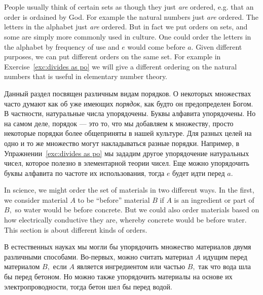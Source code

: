 \documentclass[../main/CT4S-EN-RU]{subfiles}
\begin{document}
\section{}\label{sec:orders}

\begin{blockENG}
People usually think of certain sets as though they just {\em are} ordered, e.g. that an order is ordained by God. For example the natural numbers just {\em are} ordered. The letters in the alphabet just {\em are} ordered. But in fact we put orders on sets, and some are simply more commonly used in culture. One could order the letters in the alphabet by frequency of use and $e$ would come before $a.$ Given different purposes, we can put different orders on the same set. For example in Exercise~\ref{exc:divides as po} we will give a different ordering on the natural numbers that is useful in elementary number theory.
\end{blockENG}

\begin{blockRUS}
Данный раздел посвящен различным видам порядков. О некоторых множествах часто думают как об уже имеющих {\em порядок}, как будто он предопределен Богом. В частности, натуральные числа упорядочены. Буквы алфавита упорядочены. Но на самом деле, порядок — это то, что мы добавляем к множеству, просто некоторые порядки более общеприняты в нашей культуре. Для разных целей на одно и то же множество могут накладываться разные порядки. Например, в Упражнении~\ref{exc:divides as po} мы зададим другое упорядочение натуральных чисел, которое полезно в элементарной теории чисел. Еще можно упорядочить буквы алфавита по частоте их использования, тогда $e$ будет идти перед $a.$ 
\end{blockRUS}

\begin{blockENG}
In science, we might order the set of materials in two different ways. In the first, we consider material $A$ to be “before” material $B$ if $A$ is an ingredient or part of $B,$ so water would be before concrete. But we could also order materials based on how electrically conductive they are, whereby concrete would be before water. This section is about different kinds of orders.
\end{blockENG}

\begin{blockRUS}
В естественных науках мы могли бы упорядочить множество материалов двумя различными способами. Во-первых, можно считать материал $A$ идущим перед материалом $B,$ если $A$ является ингредиентом или частью $B,$ так что вода шла бы перед бетоном. Но можно также упорядочить материалы на основе их электропроводности, тогда бетон шел бы перед водой.
\end{blockRUS}
\end{document}
